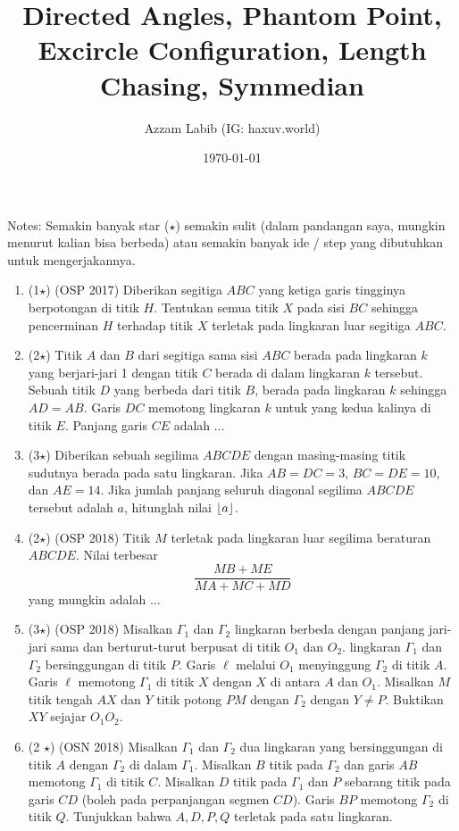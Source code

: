 \documentclass[11pt]{scrartcl}
\title{Directed Angles, Phantom Point, Excircle Configuration, Length Chasing, Symmedian}
\author{Azzam Labib (IG: haxuv.world)}
\date{\today}
\begin{document}
\maketitle

Notes: Semakin banyak star ($\star$) semakin sulit (dalam pandangan saya, mungkin menurut kalian bisa berbeda) atau semakin banyak ide / step yang dibutuhkan untuk mengerjakannya.

\begin{enumerate}
    \item (1$\star$) (OSP 2017) Diberikan segitiga $ABC$ yang ketiga garis tingginya berpotongan di titik $H$. Tentukan semua titik $X$ pada sisi $BC$ sehingga pencerminan $H$ terhadap titik $X$ terletak pada lingkaran luar segitiga $ABC$.
    
    \item (2$\star$) Titik $A$ dan $B$ dari segitiga sama sisi $ABC$ berada pada lingkaran $k$ yang berjari-jari 1 dengan titik $C$ berada di dalam lingkaran $k$ tersebut. Sebuah titik $D$ yang berbeda dari titik $B$, berada pada lingkaran $k$ sehingga $AD=AB$. Garis $DC$ memotong lingkaran $k$ untuk yang kedua kalinya di titik $E$. Panjang garis $CE$ adalah $\dots$ %

    \item (3$\star$) Diberikan sebuah segilima $ABCDE$ dengan masing-masing titik sudutnya berada pada satu lingkaran. Jika $AB=DC=3$, $BC=DE=10$, dan $AE=14$. Jika jumlah panjang seluruh diagonal segilima $ABCDE$ tersebut adalah $a$, hitunglah nilai $\left\lfloor a \right\rfloor$.

    \item (2$\star$) (OSP 2018) Titik $M$ terletak pada lingkaran luar segilima beraturan $ABCDE$. Nilai terbesar
    \[
    \frac{MB+ME}{MA+MC+MD}
    \]
    yang mungkin adalah ...

    \item (3$\star$) (OSP 2018) Misalkan $\Gamma_1$ dan $\Gamma_2$ lingkaran berbeda dengan panjang jari-jari sama dan berturut-turut berpusat di titik $O_1$ dan $O_2$. lingkaran $\Gamma_1$ dan $\Gamma_2$ bersinggungan di titik $P$. Garis $\ell$ melalui $O_1$ menyinggung $\Gamma_2$ di titik $A$. Garis $\ell$ memotong $\Gamma_1$ di titik $X$ dengan $X$ di antara $A$ dan $O_1$. Misalkan $M$ titik tengah $AX$ dan $Y$ titik potong $PM$ dengan $\Gamma_2$ dengan $Y \neq P$. Buktikan $XY$ sejajar $O_1O_2$.

    \item (2 $\star$) (OSN 2018) Misalkan $\Gamma_1$ dan $\Gamma_2$ dua lingkaran yang bersinggungan di titik $A$ dengan $\Gamma_2$ di dalam $\Gamma_1$. Misalkan $B$ titik pada $\Gamma_2$ dan garis $AB$ memotong $\Gamma_1$ di titik $C$. Misalkan $D$ titik pada $\Gamma_1$ dan $P$ sebarang titik pada garis $CD$ (boleh pada perpanjangan segmen $CD$). Garis $BP$ memotong $\Gamma_2$ di titik $Q$. Tunjukkan bahwa $A, D, P, Q$ terletak pada satu lingkaran.


\end{enumerate}
\end{document}

